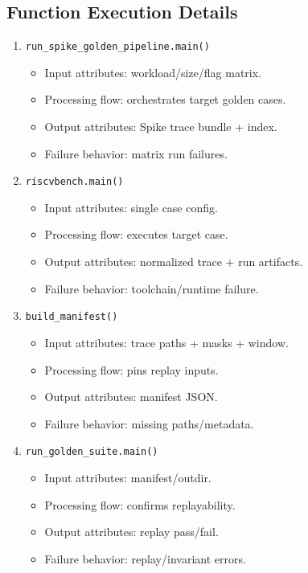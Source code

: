 \documentclass[11pt,a4paper]{article}
\begin{document}
\subsection*{Function Execution Details}
\begin{enumerate}[leftmargin=*]
  \item \texttt{run\_spike\_golden\_pipeline.main()}
  \begin{itemize}[leftmargin=*]
    \item Input attributes: workload/size/flag matrix.
    \item Processing flow: orchestrates target golden cases.
    \item Output attributes: Spike trace bundle + index.
    \item Failure behavior: matrix run failures.
  \end{itemize}
  \item \texttt{riscvbench.main()}
  \begin{itemize}[leftmargin=*]
    \item Input attributes: single case config.
    \item Processing flow: executes target case.
    \item Output attributes: normalized trace + run artifacts.
    \item Failure behavior: toolchain/runtime failure.
  \end{itemize}
  \item \texttt{build\_manifest()}
  \begin{itemize}[leftmargin=*]
    \item Input attributes: trace paths + masks + window.
    \item Processing flow: pins replay inputs.
    \item Output attributes: manifest JSON.
    \item Failure behavior: missing paths/metadata.
  \end{itemize}
  \item \texttt{run\_golden\_suite.main()}
  \begin{itemize}[leftmargin=*]
    \item Input attributes: manifest/outdir.
    \item Processing flow: confirms replayability.
    \item Output attributes: replay pass/fail.
    \item Failure behavior: replay/invariant errors.
  \end{itemize}
\end{enumerate}
\end{document}
